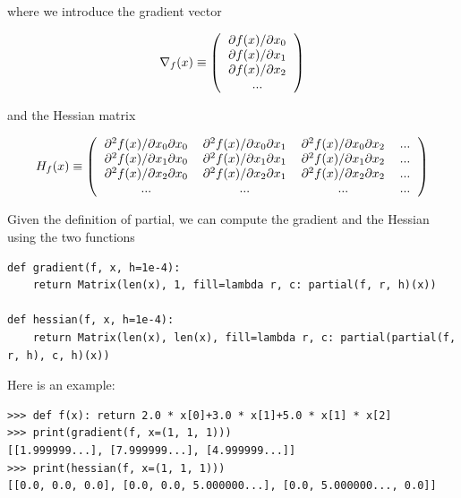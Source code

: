 \documentclass[justified, sixbynine]{tufte-book}
\def\ft{\small\tt}
\theoremstyle{plain}%
\newtheorem * {corollary}{Corollary}
\theoremstyle{definition}
\theoremstyle{remark}
\newtheorem * {remark}{Remark}
\newtheorem * {note}{Note}
\begin{document}
\begin{fullwidth}
where we introduce the gradient vector

\begin{equation}
\nabla_f(x) \equiv \left(
\begin{tabular}{c}
$\partial f(x)/\partial x_0$ \\
$\partial f(x)/\partial x_1$ \\
$\partial f(x)/\partial x_2$ \\
...
\end{tabular}
\right)
\end{equation}

and the Hessian matrix

\begin{equation}
H_f(x) \equiv \left(
\begin{tabular}{cccc}
$\partial^2 f(x)/\partial x_0\partial x_0$ &
$\partial^2 f(x)/\partial x_0\partial x_1$ &
$\partial^2 f(x)/\partial x_0\partial x_2$ &
... \\
$\partial^2 f(x)/\partial x_1\partial x_0$ &
$\partial^2 f(x)/\partial x_1\partial x_1$ &
$\partial^2 f(x)/\partial x_1\partial x_2$ &
... \\
$\partial^2 f(x)/\partial x_2\partial x_0$ &
$\partial^2 f(x)/\partial x_2\partial x_1$ &
$\partial^2 f(x)/\partial x_2\partial x_2$ &
... \\
... & ... & ... & ...
\end{tabular}
\right)
\end{equation}

Given the definition of partial, we can compute the gradient and the Hessian using the two functions

\begin{lstlisting}[caption={in file: {\ft nlib.py}}]
def gradient(f, x, h=1e-4):
    return Matrix(len(x), 1, fill=lambda r, c: partial(f, r, h)(x))

def hessian(f, x, h=1e-4):
    return Matrix(len(x), len(x), fill=lambda r, c: partial(partial(f, r, h), c, h)(x))
\end{lstlisting}

Here is an example:

\begin{lstlisting}[caption={in file: {\ft nlib.py}}]
>>> def f(x): return 2.0 * x[0]+3.0 * x[1]+5.0 * x[1] * x[2]
>>> print(gradient(f, x=(1, 1, 1)))
[[1.999999...], [7.999999...], [4.999999...]]
>>> print(hessian(f, x=(1, 1, 1)))
[[0.0, 0.0, 0.0], [0.0, 0.0, 5.000000...], [0.0, 5.000000..., 0.0]]
\end{lstlisting}


\end{fullwidth}
\end{document}
